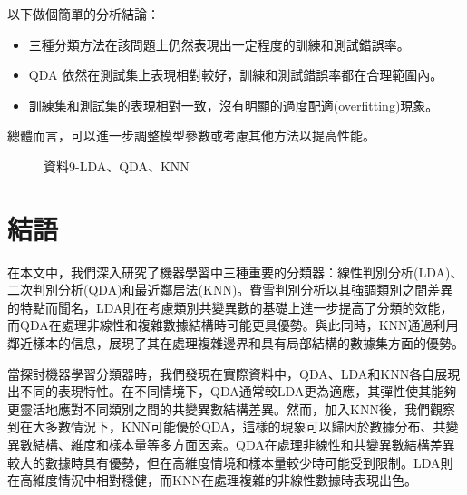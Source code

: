 \documentclass[12pt, a4paper]{article}
\begin{document}
以下做個簡單的分析結論：
\begin{itemize}
\item 三種分類方法在該問題上仍然表現出一定程度的訓練和測試錯誤率。
\item QDA 依然在測試集上表現相對較好，訓練和測試錯誤率都在合理範圍內。
\item 訓練集和測試集的表現相對一致，沒有明顯的過度配適(overfitting)現象。
\end{itemize}
總體而言，可以進一步調整模型參數或考慮其他方法以提高性能。\\
\begin{table} [H]
\centering
    \caption{資料9之LDA、QDA、KNN錯判率}\label{tb:la9-LDAQDAKNN}
    \renewcommand\arraystretch{1.5}
\end{table}
\begin{figure}[H]
    \caption{資料9-LDA、QDA、KNN}
    \label{fig:la9-LDAQDAKNN}
\end{figure}

\section{結語}
在本文中，我們深入研究了機器學習中三種重要的分類器：線性判別分析(LDA)、二次判別分析(QDA)和最近鄰居法(KNN)。費雪判別分析以其強調類別之間差異的特點而聞名，LDA則在考慮類別共變異數的基礎上進一步提高了分類的效能，而QDA在處理非線性和複雜數據結構時可能更具優勢。與此同時，KNN通過利用鄰近樣本的信息，展現了其在處理複雜邊界和具有局部結構的數據集方面的優勢。

當探討機器學習分類器時，我們發現在實際資料中，QDA、LDA和KNN各自展現出不同的表現特性。在不同情境下，QDA通常較LDA更為適應，其彈性使其能夠更靈活地應對不同類別之間的共變異數結構差異。然而，加入KNN後，我們觀察到在大多數情況下，KNN可能優於QDA，這樣的現象可以歸因於數據分布、共變異數結構、維度和樣本量等多方面因素。QDA在處理非線性和共變異數結構差異較大的數據時具有優勢，但在高維度情境和樣本量較少時可能受到限制。LDA則在高維度情況中相對穩健，而KNN在處理複雜的非線性數據時表現出色。
\end{document}
